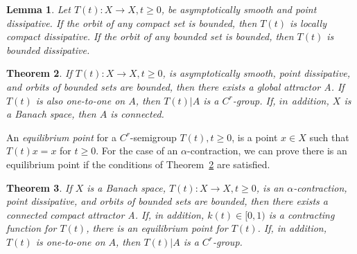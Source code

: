 \documentclass{surv-l}
\theoremstyle{plain}
\newtheorem{theorem}{Theorem}[section]
\newtheorem{lemma}[theorem]{Lemma}
\theoremstyle{definition}
\numberwithin{equation}{section}
\numberwithin{figure}{chapter}
\begin{document}
\begin{lemma}\label{lem3.4.5} Let $T(t)\!:X\rightarrow X, t\geq 0$, be asymptotically smooth and point dissipative. If the orbit of any compact set is bounded, then $T(t)$ is locally compact dissipative. If the orbit of any bounded set is bounded, then $T(t)$ is bounded dissipative.
\end{lemma}

\begin{theorem}\label{thm3.4.6} If $T(t)\!:X\rightarrow X, t\geq 0$, is asymptotically smooth, point dissipative, and orbits of bounded sets are bounded, then there exists a global attractor A. If $T(t)$ is also one-to-one on $A$, then $T(t)|A$ is a $C^{r}$-group. If, $in$ addition, $X$ is a Banach space, then $A$ is connected.
\end{theorem}

An \emph{equilibrium point} for a $C^{r}$-semigroup $T(t), t\geq 0$, is a point $x\in X$ such that $T(t)x=x$ for $t\geq 0$. For the case of an $\alpha$-contraction, we can prove there is an equilibrium point if the conditions of Theorem~\ref{thm3.4.6} are satisfied.

\begin{theorem}\label{thm3.4.7} If $X$ is a Banach space, $T(t)\!:X\rightarrow X,t\geq 0$, is an $\alpha$-contraction, point dissipative, and orbits of bounded sets are bounded, then there exists a connected compact attractor A. If, in addition, $k(t)\in[0,1)$ is a contracting function for $T(t)$, there is an equilibrium point for $T(t)$. If, in addition, $T(t)$ is one-to-one on $A$, then $T(t)|A$ is a $C^{r}$-group.
\end{theorem}
\end{document}
